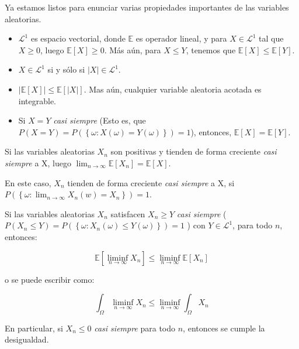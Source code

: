 Ya estamos listos para enunciar varias propiedades importantes de las variables aleatorias.

\begin{theorem}
	\begin{itemize}
		\item $\mathcal{L}^1$ es espacio vectorial, donde $\mathbb{E}$ es operador lineal, y para $X \in \mathcal{L}^1$ tal que $X \geq 0$, luego $\mathbb{E}[X] \geq 0$. Más aún, para $X \leq Y$, tenemos que $\mathbb{E}[X] \leq \mathbb{E}[Y]$.
		\item $X \in \mathcal{L}^1$ si y sólo si $| X | \in \mathcal{L}^1$.
		\item $\left\lvert \mathbb{E}[X] \right\rvert \leq \mathbb{E}[ \left\lvert X \right\rvert ]$. Mas aún, cualquier variable aleatoria acotada es integrable.
		\item Si $X = Y$ \textit{casi siempre} (Esto es, que $P(X = Y) = P(\left\{ \omega : X(\omega) = Y(\omega) \right\}) = 1$), entonces, $\mathbb{E}[X] = \mathbb{E}[Y]$. 
	\end{itemize}	

\end{theorem}

\begin{theorem}
	Si las variables aleatorias $X_n$ son positivas y tienden de forma creciente \textit{casi siempre} a X, luego $\lim_{n \rightarrow \infty} \mathbb{E}[X_n] = \mathbb{E}[X]$.
\end{theorem}

En este caso, $X_n$ tienden de forma creciente \textit{casi siempre} a X, si \\$P( \left\{ \omega : \lim_{n \rightarrow \infty } X_n (w) = X_n \right\} ) = 1$.

\begin{lema}
	Si las variables aleatorias $X_n$ satisfacen $X_n \geq Y$ \textit{casi siempre} ( $P( X_n \leq Y ) = P( \left\{ \omega : X_n(\omega) \leq Y(\omega) \right\}) = 1$ ) con $Y \in \mathcal{L}^1$, para todo $n$, entonces:

	\[
		\mathbb{E}\left[\liminf_{n \rightarrow \infty} X_n\right] \leq \liminf_{n \rightarrow \infty} \mathbb{E}[X_n]
 	\]

 	o se puede escribir como:

 	\[
 		\int_{\Omega} \liminf_{n \rightarrow \infty} X_n \leq \liminf_{n \rightarrow \infty} \int_{\Omega}  X_n
 	\]

 	En particular, si $X_n \leq 0$ \textit{casi siempre} para todo $n$, entonces se cumple la desigualdad.

\end{lema}

